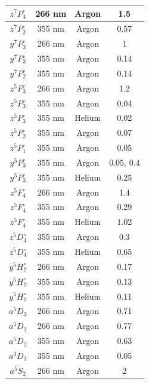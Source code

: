 \documentclass[12pt,twoside]{reedthesis}
\begin{document}
\begin{longtable}{||c|c|c|c||}
            $z^{7}P^{\circ}_{4}$ & 266 nm & Argon & 1.5 \\\hline
            $z^{7}P^{\circ}_{2}$ & 355 nm & Argon & 0.57 \\\hline
            $y^{7}P^{\circ}_{3}$ & 266 nm & Argon & 1 \\\hline
            $y^{7}P^{\circ}_{3}$ & 355 nm & Argon & 0.14 \\\hline
            $y^{7}P^{\circ}_{2}$ & 355 nm & Argon & 0.14 \\\hline
            $z^{5}P^{\circ}_{3}$ & 266 nm & Argon & 1.2 \\\hline
            $z^{5}P^{\circ}_{3}$ & 355 nm & Argon & 0.04 \\\hline
            $z^{5}P^{\circ}_{3}$ & 355 nm & Helium & 0.02 \\\hline
            $z^{5}P^{\circ}_{2}$ & 355 nm & Argon & 0.07 \\\hline
            $z^{5}P^{\circ}_{1}$ & 355 nm & Argon & 0.05 \\\hline
            $y^{5}P^{\circ}_{3}$ & 355 nm & Argon & 0.05, 0.4 \\\hline
            $y^{5}P^{\circ}_{3}$ & 355 nm & Helium & 0.25 \\\hline
            $z^{5}F^{\circ}_{4}$ & 266 nm & Argon & 1.4 \\\hline
            $z^{5}F^{\circ}_{4}$ & 355 nm & Argon & 0.29 \\\hline
            $z^{5}F^{\circ}_{4}$ & 355 nm & Helium & 1.02 \\\hline
            $z^{5}D^{\circ}_{4}$ & 355 nm & Argon & 0.3 \\\hline
            $z^{5}D^{\circ}_{4}$ & 355 nm & Helium & 0.65 \\\hline
            $y^{5}H^{\circ}_{7}$ & 266 nm & Argon & 0.17 \\\hline
            $y^{5}H^{\circ}_{7}$ & 355 nm & Argon & 0.13 \\\hline
            $y^{5}H^{\circ}_{7}$ & 355 nm & Helium & 0.11 \\\hline
            $a^{5}D_{3}$ & 266 nm & Argon & 0.71 \\\hline
            $a^{5}D_{2}$ & 266 nm & Argon & 0.77 \\\hline
            $a^{5}D_{2}$ & 355 nm & Argon & 0.63 \\\hline
            $a^{3}D_{3}$ & 355 nm & Argon & 0.05 \\\hline
            $a^{5}S_{2}$ & 266 nm & Argon & 2 \\\hline

\end{longtable}
\end{document}
